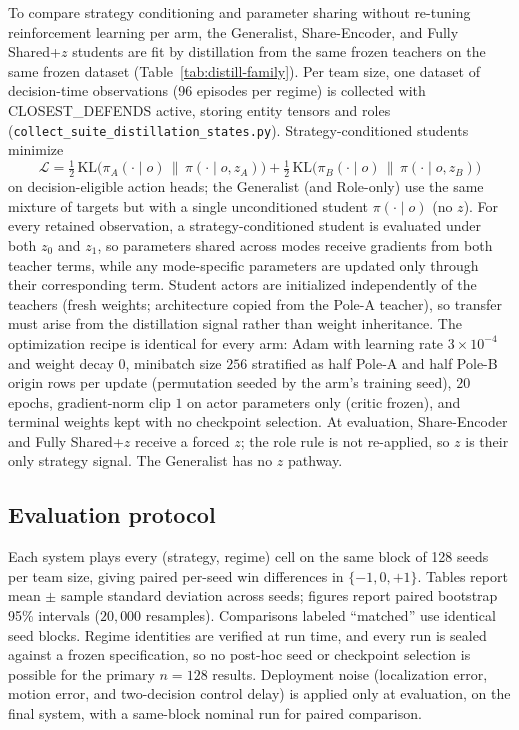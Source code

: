 To compare strategy conditioning and parameter sharing without re-tuning
reinforcement learning per arm, the Generalist, Share-Encoder, and Fully
Shared+\(z\) students are fit by distillation from the same frozen teachers on
the same frozen dataset (Table~\ref{tab:distill-family}). Per team size, one
dataset of decision-time observations (96 episodes per regime) is collected
with CLOSEST\_DEFENDS active, storing entity tensors and roles
(\texttt{collect\_suite\_distillation\_states.py}). Strategy-conditioned
students minimize
\[
\mathcal{L}
=\tfrac12\,\mathrm{KL}\!\big(\pi_A(\cdot\mid o)\,\|\,\pi(\cdot\mid o,z_A)\big)
+\tfrac12\,\mathrm{KL}\!\big(\pi_B(\cdot\mid o)\,\|\,\pi(\cdot\mid o,z_B)\big)
\]
on decision-eligible action heads; the Generalist (and Role-only) use the same
mixture of targets but with a single unconditioned student \(\pi(\cdot\mid o)\)
(no \(z\)). For every retained observation, a strategy-conditioned student is
evaluated under both \(z_0\) and \(z_1\), so parameters shared across modes
receive gradients from both teacher terms, while any mode-specific parameters
are updated only through their corresponding term. Student actors are
initialized independently of the teachers (fresh weights; architecture copied
from the Pole-A teacher), so transfer must arise from the distillation signal
rather than weight inheritance. The optimization recipe is identical for every
arm: Adam with learning rate \(3\times10^{-4}\) and weight decay \(0\),
minibatch size \(256\) stratified as half Pole-A and half Pole-B origin rows
per update (permutation seeded by the arm's training seed), \(20\) epochs,
gradient-norm clip \(1\) on actor parameters only (critic frozen), and terminal
weights kept with no checkpoint selection. At evaluation,
Share-Encoder and Fully Shared+\(z\) receive a forced \(z\); the role rule is
not re-applied, so \(z\) is their only strategy signal. The Generalist has no
\(z\) pathway.

\subsection{Evaluation protocol}
\label{sec:method-eval}

Each system plays every (strategy, regime) cell on the same block of 128
seeds per team size, giving paired per-seed win differences in
\(\{-1,0,+1\}\). Tables report mean \(\pm\) sample standard deviation across
seeds; figures report paired bootstrap 95\% intervals
(\(20{,}000\) resamples). Comparisons labeled ``matched'' use identical seed
blocks. Regime identities are verified at run time, and every run is sealed
against a frozen specification, so no post-hoc seed or checkpoint selection
is possible for the primary \(n=128\) results. Deployment noise (localization
error, motion error, and two-decision control delay) is applied only at
evaluation, on the final system, with a same-block nominal run for paired
comparison.

